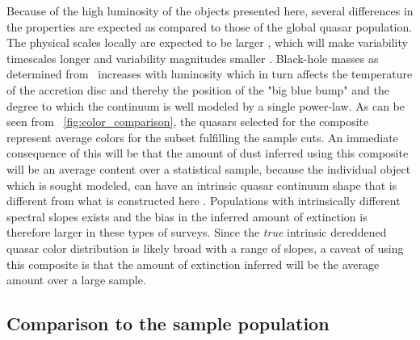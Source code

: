 \documentclass{aa}    %
\newcommand{\figref}[1]{\ref{fig:#1}}
\newcommand{\Fig}[1]{\figurename~\figref{#1}}
\newcommand{\fig}[1]{\Fig{#1}}
\newcommand{\sectlabel}[1]{\label{sect:#1}}
\newcommand{\mgii}{\ion{Mg}{ii}}
\begin{document}
Because of the high luminosity of the objects presented here, several differences in the properties are expected as compared to those of the global quasar population. The physical scales locally are expected to be larger \citep{Bentz2013}, which will make variability timescales longer and variability magnitudes smaller \citep{VandenBerk2004, Schmidt2012}. Black-hole masses as determined from \mgii~increases with luminosity \citep{wu2015} which in turn affects the temperature of the accretion disc \citep{shakura1973, Pereyra2006} and thereby the position of the "big blue bump" and the degree to which the continuum is well modeled by a single power-law\citep[see also][for a discussion]{Lusso2015}. As can be seen from \fig{color_comparison}, the quasars selected for the composite represent average colors for the subset fulfilling the sample cuts. An immediate consequence of this will be that the amount of dust inferred using this composite will be an average content over a statistical sample, because the individual object which is sought modeled, can have an intrinsic quasar continuum shape that is different from what is constructed here \citep{Richards2003, Hopkins2004a}. Populations with intrinsically different spectral slopes exists \citep{Glikman2012, Krawczyk2015} and the bias in the inferred amount of extinction is therefore larger in these types of surveys. Since the \textit{true} intrinsic dereddened quasar color distribution is likely broad with a range of slopes, a caveat of using this composite is that the amount of extinction inferred will be the average amount over a large sample.



\subsection{Comparison to the sample population}  \sectlabel{sample_pop}
\end{document}

